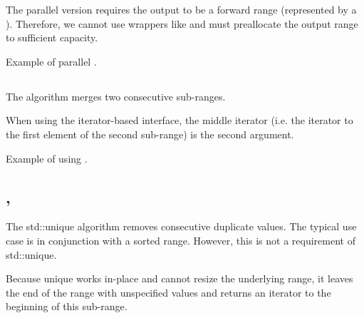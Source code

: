 The parallel version requires the output to be a forward range (represented by a ). Therefore, we cannot use wrappers like  and must preallocate the output range to sufficient capacity.

\begin{box-note}
\footnotesize Example of parallel .
\tcblower
{}
\end{box-note}

\subsection{\texorpdfstring{}{\texttt{std::inplace\_merge}}}

The  algorithm merges two consecutive sub-ranges.


When using the iterator-based interface, the middle iterator (i.e. the iterator to the first element of the second sub-range) is the second argument.

\begin{box-note}
\footnotesize Example of using .
\tcblower
{}
\end{box-note}

\subsection{\texorpdfstring{, }{\texttt{std::unique}, \texttt{std::unique\_copy}}}

The std::unique algorithm removes consecutive duplicate values. The typical use case is in conjunction with a sorted range. However, this is not a requirement of std::unique.


Because unique works in-place and cannot resize the underlying range, it leaves the end of the range with unspecified values and returns an iterator to the beginning of this sub-range.

